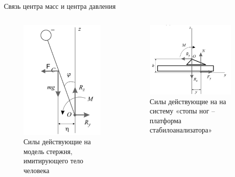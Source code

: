 \documentclass[10pt]{beamer}
\begin{document}
\begin{frame}{Связь центра масс и центра давления}
	\begin{columns}
		\begin{figure}[h!]
			\includegraphics[width=0.7\linewidth]{body_1.pdf}
			\caption{Силы действующие на модель стержня, имитирующего тело человека}
		\end{figure}
		\begin{figure}[h!]
			\includegraphics[width=0.8\linewidth]{images_pres/foot.png}
			\caption{Силы действующие на на систему «стопы ног – платформа стабилоанализатора» }
		\end{figure}
	\end{columns}

\end{frame}
\end{document}
